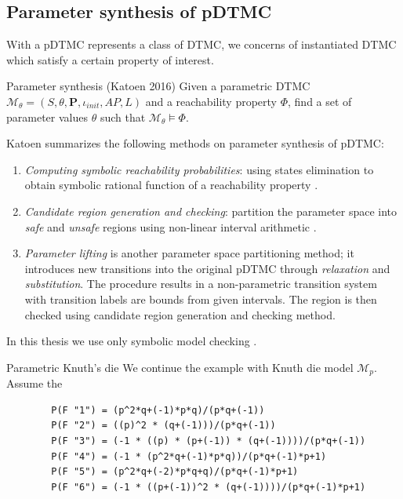 \subsection{Parameter synthesis of pDTMC}
With a pDTMC represents a class of DTMC, we concerns of instantiated DTMC which satisfy a certain property of interest.
\begin{definition}{Parameter synthesis (Katoen 2016)\cite{katoen2016probabilistic}} Given a
    parametric DTMC $\mathcal{M}_\theta = (S, \theta, \mathbf{P}, \iota_{init}, AP, L)$ and a
    reachability property $\Phi$, find a set of parameter values $\theta$ such that
    $\mathcal{M}_\theta \models \Phi$.
\end{definition}
Katoen \cite{katoen2013model} summarizes the following methods on parameter synthesis of pDTMC:
\begin{enumerate}
    \item \textit{Computing symbolic reachability probabilities}: using states elimination to obtain symbolic
          rational function of a reachability property \cite{daws2004symbolic}
          \cite{hahn2011probabilistic}.
    \item \textit{Candidate region generation and checking}: partition the parameter space into \textit{safe}
          and \textit{unsafe} regions using non-linear interval arithmetic
          \cite{kwiatkowska2006symmetry}.
    \item \textit{Parameter lifting} is another parameter space partitioning method; it introduces
          new transitions into the original pDTMC through \textit{relaxation} and
          \textit{substitution}. The procedure results in a non-parametric transition system with
          transition labels are bounds from given intervals. The region is then checked using
          candidate region generation and checking method.
\end{enumerate}
In this thesis we use only symbolic model checking \cite{daws2004symbolic}.
\begin{example}{Parametric Knuth's die}
    We continue the example with Knuth die model $\mathcal{M}_{p}$. Assume the
    \begin{lstlisting}
        P(F "1") = (p^2*q+(-1)*p*q)/(p*q+(-1))
        P(F "2") = ((p)^2 * (q+(-1)))/(p*q+(-1))
        P(F "3") = (-1 * ((p) * (p+(-1)) * (q+(-1))))/(p*q+(-1))
        P(F "4") = (-1 * (p^2*q+(-1)*p*q))/(p*q+(-1)*p+1)
        P(F "5") = (p^2*q+(-2)*p*q+q)/(p*q+(-1)*p+1)
        P(F "6") = (-1 * ((p+(-1))^2 * (q+(-1))))/(p*q+(-1)*p+1)
    \end{lstlisting}
\end{example}
